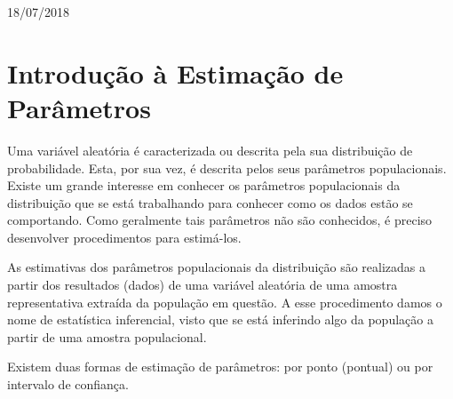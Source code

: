 \begin{titlepage}


{\large 18/07/2018}\\[2cm] %


 

\vfill %

\end{titlepage}


\section{Introdução à Estimação de Parâmetros}

 Uma variável aleatória é caracterizada ou descrita pela sua distribuição de probabilidade. Esta, por sua vez, é descrita pelos seus parâmetros populacionais. Existe um grande interesse em conhecer os parâmetros populacionais da distribuição que se está trabalhando para conhecer como os dados estão se comportando. Como geralmente tais parâmetros não são conhecidos, é preciso desenvolver procedimentos para estimá-los.
 
As estimativas dos parâmetros populacionais da distribuição são realizadas a partir dos resultados (dados) de uma variável aleatória de uma amostra representativa extraída da população em questão. A esse procedimento damos o nome de estatística inferencial, visto que se está inferindo algo da população a partir de uma amostra populacional.

Existem duas formas de estimação de parâmetros: por ponto (pontual) ou por intervalo de confiança. 

